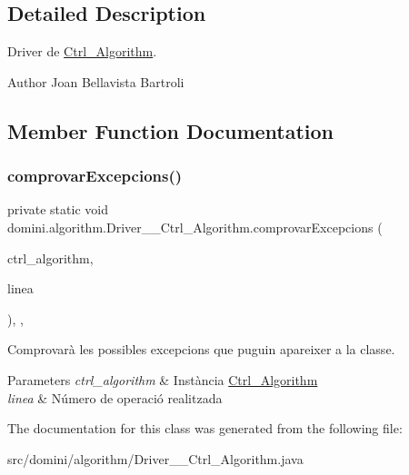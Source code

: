 \subsection{Detailed Description}
Driver de \hyperlink{classdomini_1_1algorithm_1_1Ctrl__Algorithm}{Ctrl\+\_\+\+Algorithm}. 

\begin{DoxyAuthor}{Author}
Joan Bellavista Bartroli 
\end{DoxyAuthor}


\subsection{Member Function Documentation}
\mbox{\label{classdomini_1_1algorithm_1_1Driver____Ctrl__Algorithm_a38ad7761ecde80325d83ce2d2597a61b}} 
\subsubsection{\texorpdfstring{comprovar\+Excepcions()}{comprovarExcepcions()}}
{\footnotesize\ttfamily private static void domini.\+algorithm.\+Driver\+\_\+\+\_\+\+Ctrl\+\_\+\+Algorithm.\+comprovar\+Excepcions (\begin{DoxyParamCaption}\item[{\hyperlink{classdomini_1_1algorithm_1_1Ctrl__Algorithm}{Ctrl\+\_\+\+Algorithm}}]{ctrl\+\_\+algorithm,  }\item[{String}]{linea }\end{DoxyParamCaption})\hspace{0.3cm}{\ttfamily [inline]}, {\ttfamily [static]}, {\ttfamily [private]}}



Comprovarà les possibles excepcions que puguin apareixer a la classe. 


\begin{DoxyParams}{Parameters}
{\em ctrl\+\_\+algorithm} & Instància \hyperlink{classdomini_1_1algorithm_1_1Ctrl__Algorithm}{Ctrl\+\_\+\+Algorithm} \\
\hline
{\em linea} & Número de operació realitzada \\
\hline
\end{DoxyParams}


The documentation for this class was generated from the following file\+:\begin{DoxyCompactItemize}
\item 
src/domini/algorithm/Driver\+\_\+\+\_\+\+Ctrl\+\_\+\+Algorithm.\+java\end{DoxyCompactItemize}
